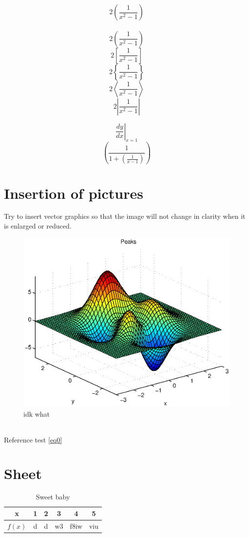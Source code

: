 \documentclass[12pt]{article}
\begin{document}
$$2(\frac{1}{x^2-1})$$ \\
$$2\left(\frac{1}{x^2-1}\right)$$
$$2\left[\frac{1}{x^2-1}\right]$$
$$2\left\{\frac{1}{x^2-1}\right\}$$
$$2\left\langle \frac{1}{x^2-1} \right\rangle$$
$$2\left| \frac{1}{x^2-1} \right|$$

$$\left.\frac{dy}{dx}\right|_{x=1}$$
$$\left( \frac{1}{1+\left(\frac{1}{x-1}\right)} \right)$$

\section{Insertion of pictures}
Try to insert vector graphics\cite{mckay2002role} so that the image will not change in clarity when it is enlarged or reduced.
\begin{figure}[htbp]
    \includegraphics[width=12cm]{mcmthesis-aaa.eps}
    \caption{idk what}
    \label{fig:a}
\end{figure}
\\Reference test \autoref{eq0}

\newpage
\section{Sheet}
\begin{table}[h]
    \centering
    \def\arraystretch{1.2}
    \begin{tabular}{|c|||ccccc|}
    \hline
    x & 1 & 2 & 3 & 4 & 5 \\ \hline
    $f(x)$ & d & d & w3 & f8iw & viu \\ \hline
    \end{tabular}
    \caption{Sweet baby}
\end{table}
\end{document}
